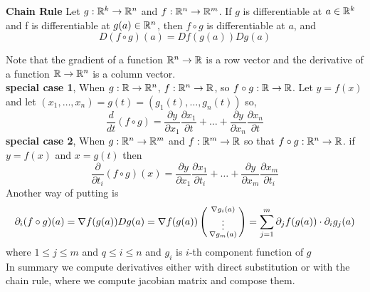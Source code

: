 \documentclass[11pt]{article}
\begin{document}
\begin{theorem}
  \label{chain rule}
  \textbf{Chain Rule} Let $g:\mathbb{R}^k \to \mathbb{R}^n$ and $f:\mathbb{R}^n\to \mathbb{R}^m$. If $g$ is differentiable at $a\in\mathbb{R}^k$ and f is differentiable at $g(a)\in \mathbb{R}^n$, then $f\circ g$ is differentiable at $a$, and
  \[
    D(f\circ g)(a) = Df(g(a))Dg(a)
  \]
  \begin{rem}
    Note that the gradient of a function $\mathbb{R}^n\to\mathbb{R}$ is a row vector and the derivative of a function $\mathbb{R}\to\mathbb{R}^n$ is a column vector.
    $ $\\
    \textbf{special case 1}, When $g:\mathbb{R} \to\mathbb{R}^n$, $f:\mathbb{R}^n \to \mathbb{R}$, so $f\circ g: \mathbb{R} \to \mathbb{R}$. Let $y = f(x)$ and let $(x_1, \dots, x_n) = g(t) = (g_1(t), \dots, g_n(t))$ so,
    \[
      \frac{d}{dt}(f\circ g) = \frac{\partial y}{\partial x_1}\frac{\partial x_1}{\partial t} + \dots + \frac{\partial y}{\partial x_n}\frac{\partial x_n}{\partial t}
    \]
    $ $\\
    \textbf{special case 2}, When $g:\mathbb{R}^n \to \mathbb{R}^m$ and $f:\mathbb{R}^m\to\mathbb{R}$ so that $f\circ g: \mathbb{R}^n \to\mathbb{R}$. if $y=f(x)$ and $x=g(t)$ then
    \[
      \frac{\partial}{\partial t_i} (f\circ g)(x) = \frac{\partial y}{\partial x_1}\frac{\partial x_1}{\partial t_i} + \dots + \frac{\partial y}{\partial x_m}\frac{\partial x_m}{\partial t_i}
    \]
    Another way of putting is
    \[
      \partial_i (f\circ g)(a) = \nabla f(g(a))Dg(a) = \nabla f(g(a))\left(\begin{smallmatrix}\nabla g_i(a)\\ \vdots \\ \nabla g_m(a)\end{smallmatrix}\right) = \sum_{j=1}^{m} \partial_j f(g(a)) \cdot \partial_i g_j(a)
    \]
    where $1\leq j \leq m$ and $q\leq i\leq n$ and $g_i$ is $i$-th component function of $g$
    $ $\\
    In summary we compute derivatives either with direct substitution or with the chain rule, where we compute jacobian matrix and compose them.
  \end{rem}
\end{theorem}
\end{document}
